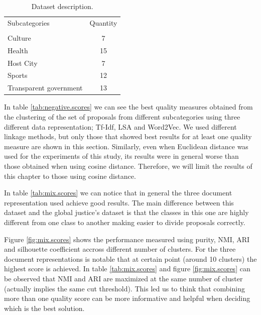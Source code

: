 \begin{table}[!htpb]
\centering
{\scriptsize %
\begin{tabular}{l|c }
 \hline
Subcategories & Quantity\\
 \\\hline\hline 
Culture & 7  \\
Health & 15  \\
Host City & 7  \\
Sports &  12  \\
Transparent government   & 13\\
\hline
\end{tabular}
}%
\caption{Dataset description.}
\label{tab:mix.desc}
\end{table}

In table \ref{tab:negative.scores} we can see the best quality measures obtained from the clustering of the set of proposals from different subcategories using three different data representation; Tf-Idf, LSA and Word2Vec. We used different linkage methods, but only those that showed best results for at least one quality measure are shown in this section. Similarly, even when Euclidean distance was used for the experiments of this study, its results were in general worse than those obtained when using cosine distance. Therefore, we will limit the results of this chapter to those using cosine distance.

In table \ref{tab:mix.scores} we can notice that in general the three document representation used achieve good results. The main difference between this dataset and the global justice's dataset is that the classes in this one are highly different from one class to another making easier to divide proposals correctly. 


Figure \ref{fig:mix.scores} shows the performance measured using purity, NMI, ARI and silhouette coefficient accross different number of clusters. For the three document representations is notable that at certain point (around 10 clusters) the highest score is achieved. In table \ref{tab:mix.scores} and figure \ref{fig:mix.scores} can be observed that NMI and ARI are maximized at the same number of cluster (actually implies the same cut threshold). This led us to think that combining more than one quality score can be more informative and helpful when deciding which is the best solution.


